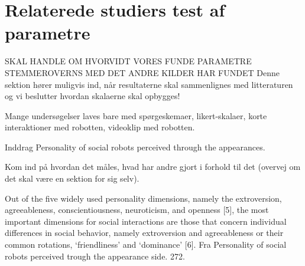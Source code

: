 \section{Relaterede studiers test af parametre}
\label{ParametreTidligereStudier}
%
SKAL HANDLE OM HVORVIDT VORES FUNDE PARAMETRE STEMMEROVERNS MED DET ANDRE KILDER HAR FUNDET\blankline
%
Denne sektion hører muligvis ind, når resultaterne skal sammenlignes med litteraturen og vi beslutter hvordan skalaerne skal opbygges!\blankline


Mange undersøgelser laves bare med spørgeskemaer, likert-skalaer, korte interaktioner med robotten, videoklip med robotten. 

\noindent Inddrag Personality of social robots perceived through the appearances.

\noindent Kom ind på hvordan det måles, hvad har andre gjort i forhold til det (overvej om det skal være en sektion for sig selv).\blankline


Out of the five widely used personality dimensions, namely the extroversion, agreeableness, conscientiousness, neuroticism, and openness [5], the most important dimensions for social interactions are those that concern individual differences in social behavior, namely extroversion and agreeableness or their common rotations, ‘friendliness’ and ‘dominance’ [6]. Fra Personality of social robots perceived trough the appearance side. 272.